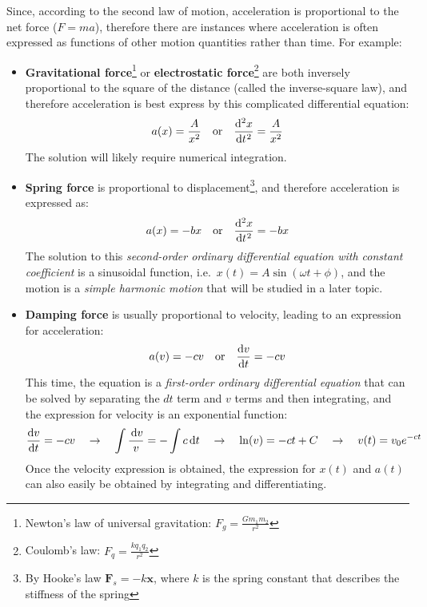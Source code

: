 \documentclass{../../../oss-handout}
\begin{document}
Since, according to the second law of motion, acceleration is proportional to
the net force ($F=ma$), therefore there are instances where acceleration is
often expressed as functions of other motion quantities rather than time. For
example:
\begin{itemize}[leftmargin=15pt]
\item\textbf{Gravitational force}\footnote{Newton's law of universal
  gravitation: $\displaystyle F_g=\frac{Gm_1m_2}{r^2}$} or
  \textbf{electrostatic force}\footnote{Coulomb's law:
    $\displaystyle F_q=\frac{kq_1q_2}{r^2}$} are both inversely proportional to
  the square of the distance (called the inverse-square law), and therefore
  acceleration is best express by this complicated differential equation:
  \begin{equation*}
    a(x)=\frac{A}{x^2} \quad\text{or}\quad \diff[2] xt=\frac{A}{x^2}
  \end{equation*}
  The solution will likely require numerical integration.

\item\textbf{Spring force} is proportional to displacement\footnote{By Hooke's
  law $\bm{F}_s=-k\bm{x}$, where $k$ is the spring constant that describes the
  stiffness of the spring}, and therefore acceleration is expressed as:
  \begin{equation*}
    a(x)=-bx\quad\text{or}\quad \diff[2] xt=-bx
  \end{equation*}
  The solution to this \emph{second-order ordinary differential equation with
    constant coefficient} is a sinusoidal function, i.e.\
  $x(t)=A\sin(\omega t+\phi)$, and the motion is a \emph{simple harmonic
    motion} that will be studied in a later topic.

\item\textbf{Damping force}  is usually proportional to velocity, leading
  to an expression for acceleration:
  \begin{equation*}
    a(v)=-cv\quad\text{or}\quad \diff vt=-cv
  \end{equation*}
  This time, the equation is a \emph{first-order ordinary differential equation}
  that can be solved by separating the $dt$ term and $v$ terms and then
  integrating, and the expression for velocity is an exponential function:
  \begin{equation*}
    \diff vt=-cv\quad\rightarrow\quad \int\frac{\dl v}{v}=-\int c\dl t
    \quad\rightarrow\quad \ln(v)=-ct+C
    \quad\rightarrow\quad v(t)=v_0e^{-ct}
  \end{equation*}
  Once the velocity expression is obtained, the expression for $x(t)$ and
  $a(t)$ can also easily be obtained by integrating and differentiating.


\end{itemize}
\end{document}
